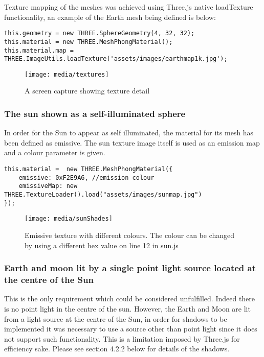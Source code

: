 \documentclass[titlepage]{article}
\begin{document}
Texture mapping of the meshes was achieved using Three.js native loadTexture functionality, an example of the Earth mesh being defined is below:
\begin{lstlisting}[caption=Above code can be found in sun.js]
this.geometry = new THREE.SphereGeometry(4, 32, 32);
this.material = new THREE.MeshPhongMaterial();
this.material.map = THREE.ImageUtils.loadTexture('assets/images/earthmap1k.jpg');
\end{lstlisting}

\begin{figure}[h!]
                \centering
                \texttt{[image: media/textures]}
                \caption{A screen capture showing texture detail}
\end{figure}


\subsubsection{The sun shown as a self-illuminated sphere}
In order for the Sun to appear as self illuminated, the material for its mesh has been defined as emissive. The sun texture image itself is used as an emission map and a colour parameter is given. 
\begin{lstlisting}
this.material =  new THREE.MeshPhongMaterial({
    emissive: 0xF2E9A6, //emission colour
    emissiveMap: new THREE.TextureLoader().load("assets/images/sunmap.jpg")
});
\end{lstlisting}
\begin{figure}[h!]
                \centering
                \texttt{[image: media/sunShades]}
                \caption{Emissive texture with different colours. The colour can be changed by using a different hex value on line 12 in sun.js}
\end{figure}

\subsubsection{Earth and moon lit by a single point light source located at the centre of the Sun}
This is the only requirement which could be considered unfulfilled. Indeed there is no point light in the centre of the sun. However, the Earth and Moon are lit from a light source at the centre of the Sun, in order for shadows to be implemented it was necessary to use a source other than point light since it does not support such functionality. This is a limitation imposed by Three.js for efficiency sake. Please see section 4.2.2 below for details of the shadows.
\end{document}
